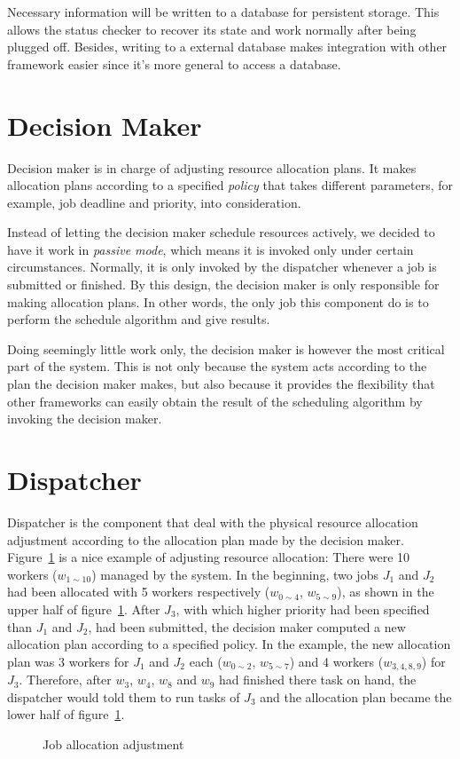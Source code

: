Necessary information will be written to a database for persistent
storage.  This allows the status checker to recover its state and work
normally after being plugged off.  Besides, writing to a external
database makes integration with other framework easier since it's more
general to access a database.

\section{Decision Maker}

Decision maker is in charge of adjusting resource allocation plans.  It
makes allocation plans according to a specified \emph{policy} that takes
different parameters, for example, job deadline and priority, into
consideration. 

Instead of letting the decision maker schedule resources actively, we
decided to have it work in \emph{passive mode}, which means it is
invoked only under certain circumstances.  Normally, it is only invoked
by the dispatcher whenever a job is submitted or finished.  By this
design, the decision maker is only responsible for making allocation
plans.  In other words, the only job this component do is to perform the
schedule algorithm and give results.  

Doing seemingly little work only, the decision maker is however the most
critical part of the system. This is not only because the system acts
according to the plan the decision maker makes, but also because it
provides the flexibility that other frameworks can easily obtain the
result of the scheduling algorithm by invoking the decision maker.

\section{Dispatcher}

Dispatcher is the component that deal with the physical resource
allocation adjustment according to the allocation plan made by the
decision maker.  Figure~\ref{fig:allocation-adjustment} is a nice
example of adjusting resource allocation: There were 10 workers
($w_{1\sim10}$) managed by the system.  In the beginning, two jobs $J_1$
and $J_2$ had been allocated with 5 workers respectively ($w_{0\sim4}$,
$w_{5\sim9}$), as shown in the upper half of
figure~\ref{fig:allocation-adjustment}.  After $J_3$, with which higher
priority had been specified than $J_1$ and $J_2$, had been submitted,
the decision maker computed a new allocation plan according to a
specified policy.  In the example, the new allocation plan was 3 workers
for $J_1$ and $J_2$ each ($w_{0\sim2}$, $w_{5\sim7}$) and 4 workers
($w_{3,4,8,9}$) for $J_3$.  Therefore, after $w_3$, $w_4$, $w_8$ and $
w_9$ had finished there task on hand, the dispatcher would told them to
run tasks of $J_3$ and the allocation plan became the lower half of
figure~\ref{fig:allocation-adjustment}.

\begin{figure}
  \centering
  
  \caption{Job allocation adjustment}
  \label{fig:allocation-adjustment}
\end{figure}
